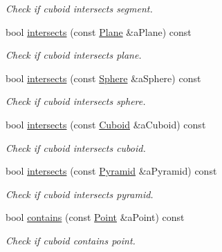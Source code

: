 \begin{DoxyCompactItemize}
\begin{DoxyCompactList}\small\item\em Check if cuboid intersects segment. \end{DoxyCompactList}\item 
bool \hyperlink{classostk_1_1math_1_1geom_1_1d3_1_1objects_1_1_cuboid_ad55e530dcadee6dfa1621ad261874a89}{intersects} (const \hyperlink{classostk_1_1math_1_1geom_1_1d3_1_1objects_1_1_plane}{Plane} \&a\+Plane) const
\begin{DoxyCompactList}\small\item\em Check if cuboid intersects plane. \end{DoxyCompactList}\item 
bool \hyperlink{classostk_1_1math_1_1geom_1_1d3_1_1objects_1_1_cuboid_aba72527a8c264f7ca79dc304e8a29fc8}{intersects} (const \hyperlink{classostk_1_1math_1_1geom_1_1d3_1_1objects_1_1_sphere}{Sphere} \&a\+Sphere) const
\begin{DoxyCompactList}\small\item\em Check if cuboid intersects sphere. \end{DoxyCompactList}\item 
bool \hyperlink{classostk_1_1math_1_1geom_1_1d3_1_1objects_1_1_cuboid_acc741e333008726d186887c49d14a00d}{intersects} (const \hyperlink{classostk_1_1math_1_1geom_1_1d3_1_1objects_1_1_cuboid}{Cuboid} \&a\+Cuboid) const
\begin{DoxyCompactList}\small\item\em Check if cuboid intersects cuboid. \end{DoxyCompactList}\item 
bool \hyperlink{classostk_1_1math_1_1geom_1_1d3_1_1objects_1_1_cuboid_a528e8cfa569be9a65a6f9f1407af4a53}{intersects} (const \hyperlink{classostk_1_1math_1_1geom_1_1d3_1_1objects_1_1_pyramid}{Pyramid} \&a\+Pyramid) const
\begin{DoxyCompactList}\small\item\em Check if cuboid intersects pyramid. \end{DoxyCompactList}\item 
bool \hyperlink{classostk_1_1math_1_1geom_1_1d3_1_1objects_1_1_cuboid_ac6e3f399ced96b348cb954a2ff0314fd}{contains} (const \hyperlink{classostk_1_1math_1_1geom_1_1d3_1_1objects_1_1_point}{Point} \&a\+Point) const
\begin{DoxyCompactList}\small\item\em Check if cuboid contains point. \end{DoxyCompactList}\item 

\end{DoxyCompactItemize}
